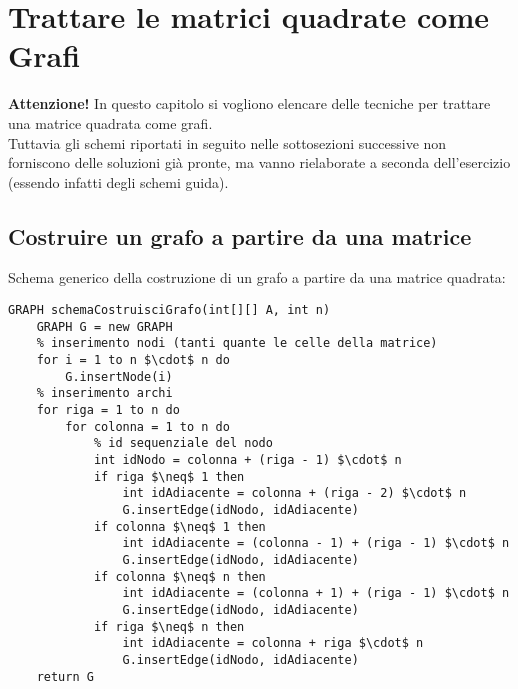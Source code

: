 \documentclass[../cheatSheetAlgoritmi.tex]{subfiles}
\begin{document}
\chapter{Trattare le matrici quadrate come Grafi}
\textbf{Attenzione!} In questo capitolo si vogliono elencare delle tecniche per trattare una matrice quadrata come grafi. \\Tuttavia gli schemi riportati in seguito nelle sottosezioni successive non forniscono delle soluzioni già pronte, ma vanno rielaborate a seconda dell'esercizio (essendo infatti degli schemi guida).
\section{Costruire un grafo a partire da una matrice}
Schema generico della costruzione di un grafo a partire da una matrice quadrata:
\begin{lstlisting}[caption=Schema costruzione Grafo da una matrice]
GRAPH schemaCostruisciGrafo(int[][] A, int n)
	GRAPH G = new GRAPH
  	% inserimento nodi (tanti quante le celle della matrice)
  	for i = 1 to n $\cdot$ n do
  		G.insertNode(i)
  	% inserimento archi
  	for riga = 1 to n do
    	for colonna = 1 to n do
      		% id sequenziale del nodo
      		int idNodo = colonna + (riga - 1) $\cdot$ n
      		if riga $\neq$ 1 then 
        		int idAdiacente = colonna + (riga - 2) $\cdot$ n
        		G.insertEdge(idNodo, idAdiacente)
      		if colonna $\neq$ 1 then
        		int idAdiacente = (colonna - 1) + (riga - 1) $\cdot$ n
        		G.insertEdge(idNodo, idAdiacente)
      		if colonna $\neq$ n then
        		int idAdiacente = (colonna + 1) + (riga - 1) $\cdot$ n
        		G.insertEdge(idNodo, idAdiacente)
      		if riga $\neq$ n then
        		int idAdiacente = colonna + riga $\cdot$ n
        		G.insertEdge(idNodo, idAdiacente)
  	return G
\end{lstlisting}
\end{document}
